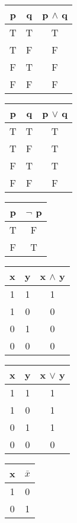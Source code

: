 \documentclass{article}
\begin{document}
\begin{CJK*}{UTF8}{gbsn}
\begin{tabular}{cc|c}
    p& q& p $\land$ q\\
    \hline
    T&T&T\\
    T&F&F\\
    F&T&F\\
    F&F&F\\
  \end{tabular}\hspace{1cm}
  \begin{tabular}{cc|c}
    p& q& p $\lor$ q\\
    \hline
    T&T&T\\
    T&F&T\\
    F&T&T\\
    F&F&F\\
  \end{tabular}\hspace{1cm}
  \begin{tabular}{c|c}
    p& $\lnot$ p\\
    \hline
    T&F\\
    F&T\\
  \end{tabular}

  \vspace{1cm}
    \begin{tabular}{cc|c}
    x& y& x $\land$ y\\
    \hline
    1&1&1\\
    1&0&0\\
    0&1&0\\
    0&0&0\\
  \end{tabular}\hspace{1cm}
  \begin{tabular}{cc|c}
    x& y& x $\lor$ y\\
    \hline
    1&1&1\\
    1&0&1\\
    0&1&1\\
    0&0&0\\
  \end{tabular}\hspace{1cm}
  \begin{tabular}{c|c}
    x& $\bar{x}$\\
    \hline
    1&0\\
    0&1\\
  \end{tabular}
  

\end{CJK*}
\end{document}
